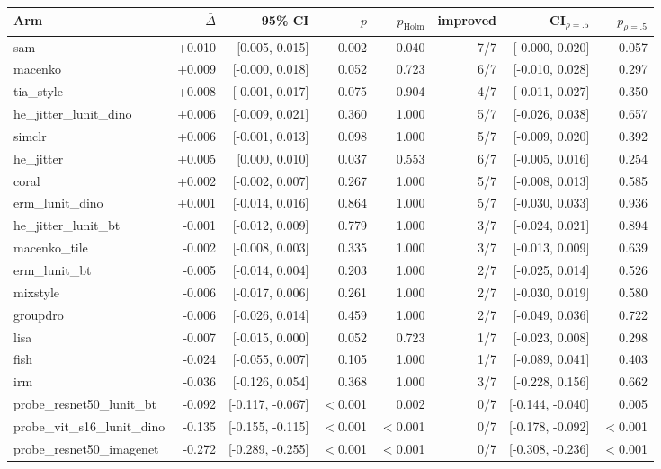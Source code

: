 \begin{tabular}{lrrrrrrr}
\toprule
Arm & $\bar\Delta$ & 95\% CI & $p$ & $p_\text{Holm}$ & improved & CI$_{\rho=.5}$ & $p_{\rho=.5}$ \\
\midrule
sam & +0.010 & [0.005, 0.015] & 0.002 & 0.040 & 7/7 & [-0.000, 0.020] & 0.057 \\
macenko & +0.009 & [-0.000, 0.018] & 0.052 & 0.723 & 6/7 & [-0.010, 0.028] & 0.297 \\
tia\_style & +0.008 & [-0.001, 0.017] & 0.075 & 0.904 & 4/7 & [-0.011, 0.027] & 0.350 \\
he\_jitter\_lunit\_dino & +0.006 & [-0.009, 0.021] & 0.360 & 1.000 & 5/7 & [-0.026, 0.038] & 0.657 \\
simclr & +0.006 & [-0.001, 0.013] & 0.098 & 1.000 & 5/7 & [-0.009, 0.020] & 0.392 \\
he\_jitter & +0.005 & [0.000, 0.010] & 0.037 & 0.553 & 6/7 & [-0.005, 0.016] & 0.254 \\
coral & +0.002 & [-0.002, 0.007] & 0.267 & 1.000 & 5/7 & [-0.008, 0.013] & 0.585 \\
erm\_lunit\_dino & +0.001 & [-0.014, 0.016] & 0.864 & 1.000 & 5/7 & [-0.030, 0.033] & 0.936 \\
he\_jitter\_lunit\_bt & -0.001 & [-0.012, 0.009] & 0.779 & 1.000 & 3/7 & [-0.024, 0.021] & 0.894 \\
macenko\_tile & -0.002 & [-0.008, 0.003] & 0.335 & 1.000 & 3/7 & [-0.013, 0.009] & 0.639 \\
erm\_lunit\_bt & -0.005 & [-0.014, 0.004] & 0.203 & 1.000 & 2/7 & [-0.025, 0.014] & 0.526 \\
mixstyle & -0.006 & [-0.017, 0.006] & 0.261 & 1.000 & 2/7 & [-0.030, 0.019] & 0.580 \\
groupdro & -0.006 & [-0.026, 0.014] & 0.459 & 1.000 & 2/7 & [-0.049, 0.036] & 0.722 \\
lisa & -0.007 & [-0.015, 0.000] & 0.052 & 0.723 & 1/7 & [-0.023, 0.008] & 0.298 \\
fish & -0.024 & [-0.055, 0.007] & 0.105 & 1.000 & 1/7 & [-0.089, 0.041] & 0.403 \\
irm & -0.036 & [-0.126, 0.054] & 0.368 & 1.000 & 3/7 & [-0.228, 0.156] & 0.662 \\
probe\_resnet50\_lunit\_bt & -0.092 & [-0.117, -0.067] & $<$0.001 & 0.002 & 0/7 & [-0.144, -0.040] & 0.005 \\
probe\_vit\_s16\_lunit\_dino & -0.135 & [-0.155, -0.115] & $<$0.001 & $<$0.001 & 0/7 & [-0.178, -0.092] & $<$0.001 \\
probe\_resnet50\_imagenet & -0.272 & [-0.289, -0.255] & $<$0.001 & $<$0.001 & 0/7 & [-0.308, -0.236] & $<$0.001 \\
\bottomrule
\end{tabular}
